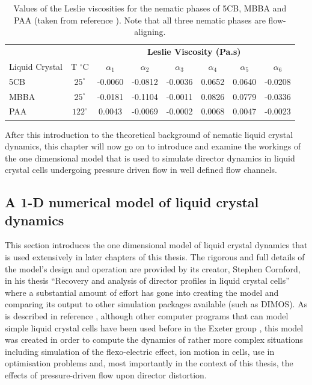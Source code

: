\begin{table}[ht]
\centering  %
\begin{tabular}{l|c|cccccc} 
\hline\hline                       
&&\multicolumn{6}{c}{\textbf{Leslie Viscosity (Pa.s)}}\\
Liquid Crystal&T $^{\circ}$C&$\alpha_1$&$\alpha_2$&$\alpha_3$&$\alpha_4$&$\alpha_5$&$\alpha_6$\\
\hline                  
5CB &$25^{\circ}$& -0.0060& -0.0812&-0.0036&0.0652&0.0640&-0.0208\\
MBBA& $25^{\circ}$&-0.0181&-0.1104&-0.0011&0.0826&0.0779&-0.0336\\
PAA& $122^{\circ}$&0.0043&-0.0069&-0.0002&0.0068&0.0047&-0.0023\\
\hline
\end{tabular}
\caption[Values of the Leslie viscosities for the nematic phases of 5CB, MBBA and PAA]{Values of the Leslie viscosities for the nematic phases of 5CB, MBBA and PAA (taken from reference \cite{Stewart2004}). Note that all three nematic phases are flow-aligning.} 
\label{tab:visc}
\end{table}

After this introduction to the theoretical background of nematic liquid crystal dynamics, this chapter will now go on to introduce and examine the workings of the one dimensional model that is used to simulate director dynamics in liquid crystal cells undergoing pressure driven flow in well defined flow channels.

\newpage

\subsection{A 1-D numerical model of liquid crystal dynamics}
This section introduces the one dimensional model of liquid crystal dynamics that is used extensively in later chapters of this thesis. The rigorous and full details of the model's design and operation are provided by its creator, Stephen Cornford, in his thesis ``Recovery and analysis of director profiles in liquid crystal cells'' \cite{Cornford2008} where a substantial amount of effort has gone into creating the model and comparing its output to other simulation packages available (such as DIMOS). As is described in reference \cite{Cornford2008}, although other computer programs that can model simple liquid crystal cells have been used before in the Exeter group \cite{Birkett2008,Jewell2002}, this model was created in order to compute the dynamics of rather more complex situations including simulation of the flexo-electric effect, ion motion in cells, use in optimisation problems and, most importantly in the context of this thesis, the effects of pressure-driven flow upon director distortion.

